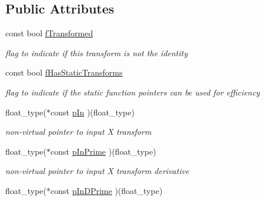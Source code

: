 \subsection*{Public Attributes}
\begin{DoxyCompactItemize}
\item 
\hypertarget{classc2__transformation_a18c8ee93daf24675a40905aaceeebd72}{const bool \hyperlink{classc2__transformation_a18c8ee93daf24675a40905aaceeebd72}{f\-Transformed}}\label{classc2__transformation_a18c8ee93daf24675a40905aaceeebd72}

\begin{DoxyCompactList}\small\item\em flag to indicate if this transform is not the identity \end{DoxyCompactList}\item 
\hypertarget{classc2__transformation_a66489da404feec82b2db467a9c3e7a1e}{const bool \hyperlink{classc2__transformation_a66489da404feec82b2db467a9c3e7a1e}{f\-Has\-Static\-Transforms}}\label{classc2__transformation_a66489da404feec82b2db467a9c3e7a1e}

\begin{DoxyCompactList}\small\item\em flag to indicate if the static function pointers can be used for efficiency \end{DoxyCompactList}\item 
float\-\_\-type($\ast$const \hyperlink{classc2__transformation_a8198a729a8e5aebce14a178a4d6a0ea6}{p\-In} )(float\-\_\-type)
\begin{DoxyCompactList}\small\item\em non-\/virtual pointer to input X transform \end{DoxyCompactList}\item 
\hypertarget{classc2__transformation_a256d983133c9f096c7fa7c7b5fb7d64f}{float\-\_\-type($\ast$const \hyperlink{classc2__transformation_a256d983133c9f096c7fa7c7b5fb7d64f}{p\-In\-Prime} )(float\-\_\-type)}\label{classc2__transformation_a256d983133c9f096c7fa7c7b5fb7d64f}

\begin{DoxyCompactList}\small\item\em non-\/virtual pointer to input X transform derivative \end{DoxyCompactList}\item 
\hypertarget{classc2__transformation_a438be3935940de5336383f0a97120b54}{float\-\_\-type($\ast$const \hyperlink{classc2__transformation_a438be3935940de5336383f0a97120b54}{p\-In\-D\-Prime} )(float\-\_\-type)}\label{classc2__transformation_a438be3935940de5336383f0a97120b54}


\end{DoxyCompactItemize}
